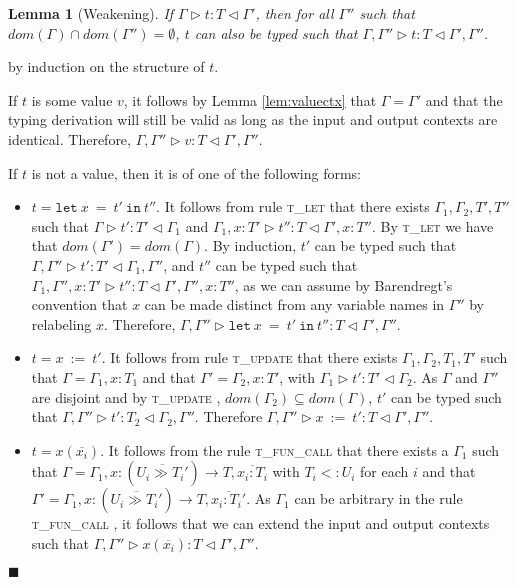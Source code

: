\documentclass{article}
\newtheorem{lem}{Lemma}
\newcommand{\lemref}[1]{Lemma \ref{#1}}
\newcommand{\tlet}{\textsc{t\_let} }
\newcommand{\tupd}{\textsc{t\_update} }
\newcommand{\tfunc}{\textsc{t\_fun\_call} }
\newcommand{\typerule}[4]{#1 \triangleright #2 : #3 \triangleleft #4}
\newcommand{\lett}[3]{\mathtt{let}\:#1\:\mathtt{=}\:#2\:\mathtt{in}\:#3}
\newcommand{\upt}[2]{#1\:\mathtt{:=}\:#2}
\newcommand{\qed}{$\blacksquare$}
\newenvironment{proof}{\vspace{1ex}\noindent{\bf Proof}\hspace{0.5em}}
  {\hfill\qed\vspace{1ex}}
\begin{document}
\begin{lem}[Weakening]
If $\typerule{\Gamma}{t}{T}{\Gamma'}$,
then for all $\Gamma''$ such that $dom(\Gamma) \cap dom(\Gamma'') = \emptyset$,
$t$ can also be typed such that
$\typerule{\Gamma, \Gamma''}{t}{T}{\Gamma', \Gamma''}$.
\end{lem}
\begin{proof}
by induction on the structure of $t$.

If $t$ is some value $v$, it follows by \lemref{lem:valuectx} that 
$\Gamma = \Gamma'$ and that the typing derivation will still be valid as long
as the input and output contexts are identical. Therefore,
$\typerule{\Gamma , \Gamma''}{v}{T}{\Gamma', \Gamma''}$.

If $t$ is not a value, then it is of one of the following forms:

\begin{itemize}
\item $t = \lett{x}{t'}{t''}$. It follows from rule \tlet that
there exists $\Gamma_1, \Gamma_2, T', T''$ such that
$\typerule{\Gamma}{t'}{T'}{\Gamma_1}$ and
$\typerule{\Gamma_1, x : T'}{t''}{T}{\Gamma', x : T''}$.
By \tlet we have that $dom(\Gamma') = dom(\Gamma)$.
By induction, $t'$ can be typed such
that $\typerule{\Gamma,\Gamma''}{t'}{T'}{\Gamma_1,\Gamma''}$,
and $t''$ can be typed such that
$\typerule{\Gamma_1, \Gamma'', x : T'}{t''}{T}{\Gamma', \Gamma'', x : T''}$,
as we can assume by Barendregt's convention that $x$ can be made distinct from
any variable names in $\Gamma''$ by relabeling $x$.
Therefore,
$\typerule{\Gamma, \Gamma''}{\lett{x}{t'}{t''}}{T}{\Gamma', \Gamma''}$.

\item $t = \upt{x}{t'}$. It follows from rule \tupd that
there exists $\Gamma_1, \Gamma_2, T_1, T'$ such that
$\Gamma = \Gamma_1, x : T_1$ and that
$\Gamma' = \Gamma_2, x : T'$, with
$\typerule{\Gamma_1}{t'}{T'}{\Gamma_2}$.
As $\Gamma$ and $\Gamma''$ are disjoint and by \tupd, 
$dom(\Gamma_2) \subseteq dom(\Gamma)$, $t'$ can be typed such that
$\typerule{\Gamma, \Gamma''}{t'}{T_2}{\Gamma_2, \Gamma''}$.
Therefore $\typerule{\Gamma, \Gamma''}{\upt{x}{t'}}{T}{\Gamma', \Gamma''}$.

\item $t = x ( \overline{x_i} )$. It follows from the rule \tfunc that
there exists a $\Gamma_1$ such that 
$\Gamma = \Gamma_1, x : (\overline{U_i \gg T_i'}) \rightarrow T, \overline{x_i : T_i}$
with $T_i <: U_i$ for each $i$
and that 
$\Gamma' = \Gamma_1, x : (\overline{U_i \gg T_i'}) \rightarrow T, \overline{x_i : T_i'}$.
As $\Gamma_1$ can be arbitrary in the rule \tfunc, it follows that we
can extend the input and output contexts such that
$\typerule{\Gamma, \Gamma''}{x ( \overline{x_i} )}{T}{\Gamma', \Gamma''}$.


\end{itemize}
\end{proof}
\end{document}

